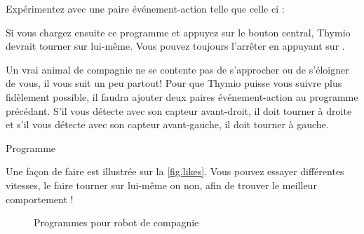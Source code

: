 \newpage

Expérimentez avec une paire événement-action telle que celle ci : 

Si vous chargez ensuite ce programme et appuyez sur le bouton central, Thymio devrait tourner sur lui-même. Vous pouvez toujours l'arrêter en appuyant sur .




Un vrai animal de compagnie ne se contente pas de s'approcher ou de s'éloigner de vous, il vous suit un peu partout! 
Pour que Thymio puisse vous suivre plus fidèlement possible, il faudra ajouter deux paires événement-action au programme précédant.
S'il vous détecte avec son capteur avant-droit, il doit tourner à droite et s'il vous détecte avec son capteur avant-gauche, il doit tourner à gauche.

{\raggedleft \hfill Programme }

Une façon de faire est illustrée sur la \cref{fig.likes}.
Vous pouvez essayer différentes vitesses, le faire tourner sur lui-même ou non, afin de trouver le meilleur comportement !

\begin{figure}
	\hfill
	\caption{Programmes pour robot de compagnie}
\end{figure}



